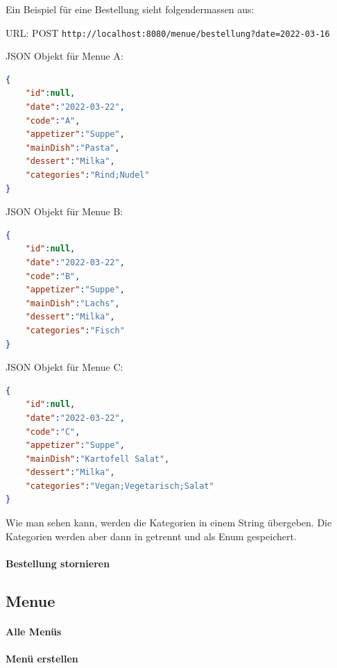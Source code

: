 Ein Beispiel für eine Bestellung sieht folgendermassen aus:

URL: POST \colorbox{white}{\lstinline[basicstyle=\ttfamily\color{black},language=html]|http://localhost:8080/menue/bestellung?date=2022-03-16|}

JSON Objekt für Menue A:

\begin{lstlisting}[language=json,firstnumber=1]
{
    "id":null,
    "date":"2022-03-22",
    "code":"A",
    "appetizer":"Suppe",
    "mainDish":"Pasta",
    "dessert":"Milka",
    "categories":"Rind;Nudel"
}
\end{lstlisting}

JSON Objekt für Menue B:

\begin{lstlisting}[language=json,firstnumber=1]
{
    "id":null,
    "date":"2022-03-22",
    "code":"B",
    "appetizer":"Suppe",
    "mainDish":"Lachs",
    "dessert":"Milka",
    "categories":"Fisch"
}
\end{lstlisting}

JSON Objekt für Menue C:

\begin{lstlisting}[language=json,firstnumber=1]
{
    "id":null,
    "date":"2022-03-22",
    "code":"C",
    "appetizer":"Suppe",
    "mainDish":"Kartofell Salat",
    "dessert":"Milka",
    "categories":"Vegan;Vegetarisch;Salat"
}
\end{lstlisting}

Wie man sehen kann, werden die Kategorien in einem String übergeben. Die Kategorien werden aber dann in getrennt und als Enum gespeichert.

\paragraph{Bestellung stornieren}



\subsection{Menue}

\paragraph{Alle Menüs}

\paragraph{Menü erstellen}

